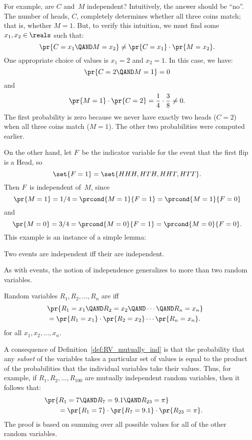 For example, are $C$ and~$M$ independent?  Intuitively, the answer
should be ``no''.  The number of heads, $C$, completely determines
whether all three coins match; that is, whether $M = 1$.  But, to
verify this intuition, we must find some $x_1, x_2 \in \reals$ such
that:
\[
\pr{C = x_1 \QAND M = x_2} \neq \pr{C = x_1} \cdot \pr{M = x_2}.
\]
One appropriate choice of values is $x_1 = 2$ and $x_2 = 1$.
In this case, we have:
\[
    \pr{C = 2 \QAND M = 1} = 0
\]
and
\begin{equation*}
    \pr{M = 1} \cdot \pr{C = 2} = \frac{1}{4} \cdot \frac{3}{8} \ne 0.
\end{equation*}
The first probability is zero because we never have exactly two heads
($C = 2$) when all three coins match ($M = 1$).  The other two
probabilities were computed earlier.

On the other hand, let $F$~be the indicator variable for the event
that the first flip is a Head, so
\[
\set{F = 1} = \set{HHH, HTH, HHT, HTT}.
\]
Then $F$~is independent of~$M$, since
\begin{equation*}
    \pr{M=1} = 1/4 = \prcond{M=1}{F=1} = \prcond{M=1}{F=0}
\end{equation*}
and
\begin{equation*}
    \pr{M=0} = 3/4 = \prcond{M=0}{F=1} = \prcond{M=0}{F=0}.
\end{equation*}
This example is an instance of a simple lemma:
\begin{lemma}
  Two events are independent iff their  are
  independent.
\end{lemma}
As with events, the notion of independence generalizes to more than two
random variables.
\begin{definition}\label{def:RV_mutually_ind}
Random variables $R_1, R_2, \dots, R_n$ are  iff
\begin{align*}
\lefteqn{\pr{R_1 = x_1 \QAND R_2 = x_2 \QAND \cdots \QAND R_n = x_n}}\\
        & =  \pr{R_1 = x_1} \cdot \pr{R_2 = x_2} \cdots \pr{R_n = x_n}.
\end{align*}
for all $x_1, x_2, \dots, x_n$.
\end{definition}

A consequence of Definition~\ref{def:RV_mutually_ind} is that the
probability that any \emph{subset} of the variables takes a particular
set of values is equal to the product of the probabilities that the
individual variables take their values.  Thus, for example, if $R_1,
R_2, \dots, R_{100}$ are mutually independent random variables, then
it follows that:
\begin{align*}
\lefteqn{\pr{R_1 = 7 \QAND R_7 = 9.1 \QAND R_{23} = \pi}}\qquad \\
& = \pr{R_1 = 7} \cdot \pr{R_7 = 9.1} \cdot \pr{R_{23} = \pi}.
\end{align*}
The proof is based on summing over all possible values for all of the
other random variables.

